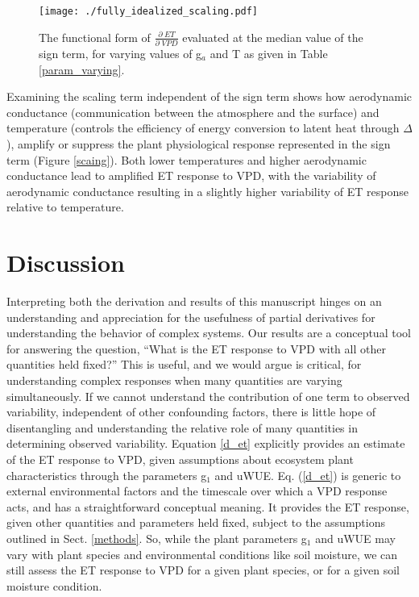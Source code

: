 \begin{figure}
  \centering \texttt{[image: ./fully\_idealized\_scaling.pdf]}
  \caption{The functional form of $\frac{\partial \; ET}{\partial
      \; VPD}$ evaluated at the median value of the sign term, for
    varying values of g$_a$ and T as given in Table \ref{param_varying}.}
  \label{scaling}
\end{figure}

Examining the scaling term independent of the sign term shows how
aerodynamic conductance (communication between the atmosphere and the
surface) and temperature (controls the efficiency of
energy conversion to latent heat through $\Delta$), amplify or suppress the plant
physiological response represented in the sign term (Figure \ref{scaing}). Both lower
temperatures and higher aerodynamic conductance lead to amplified ET
response to VPD, with the variability of aerodynamic conductance
resulting in a slightly higher variability of ET response relative to
temperature.

\section{Discussion}
\label{discussion}

Interpreting both the derivation and results of this manuscript hinges
on an understanding and appreciation for the usefulness of partial
derivatives for understanding the behavior of complex systems. Our
results are a conceptual tool for answering the question, ``What is
the ET response to VPD with all other quantities held fixed?'' This is
useful, and we would argue is critical, for understanding complex
responses when many quantities are varying simultaneously. If we
cannot understand the contribution of one term to observed
variability, independent of other confounding factors, there is little
hope of disentangling and understanding the relative role of many
quantities in determining observed variability.  Equation \ref{d_et}
explicitly provides an estimate of the ET response to VPD, given
assumptions about ecosystem plant characteristics through the
parameters g$_1$ and uWUE. Eq. (\ref{d_et}) is generic to external
environmental factors and the timescale over which a VPD response
acts, and has a straightforward conceptual meaning. It provides the ET
response, given other quantities and parameters held fixed, subject to
the assumptions outlined in Sect. \ref{methods}. So, while the plant
parameters g$_1$ and uWUE may vary with plant species and
environmental conditions like soil moisture, we can still assess the
ET response to VPD for a given plant species, or for a given soil
moisture condition.


